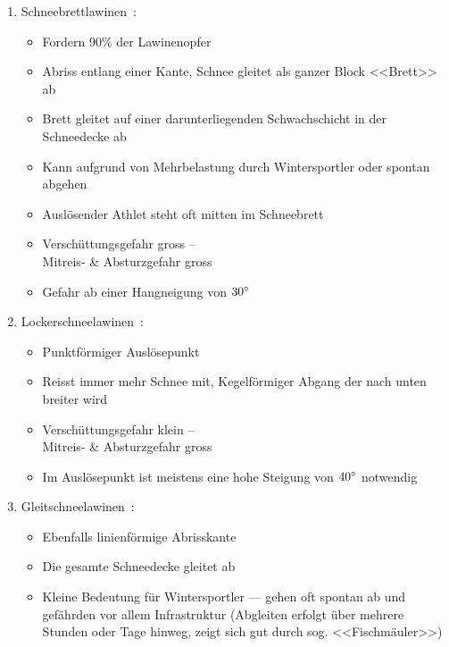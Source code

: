 
\begin{enumerate}
  \item Schneebrettlawinen~\cite{harveyrhynerschweizerlawinenkunde}\cite{sacbergspwinter}\cite{slfLawinentypen}:
  \begin{itemize}
    \item Fordern 90\% der Lawinenopfer
    \item Abriss entlang einer Kante, Schnee gleitet als ganzer Block <<Brett>> ab
    \item Brett gleitet auf einer darunterliegenden Schwachschicht in der Schneedecke ab
    \item Kann aufgrund von Mehrbelastung durch Wintersportler oder spontan abgehen
    \item Auslösender Athlet steht oft mitten im Schneebrett
    \item Verschüttungsgefahr gross –\\ Mitreis- \& Absturzgefahr gross
    \item Gefahr ab einer Hangneigung von $30\degree$
  \end{itemize}
    
  \item Lockerschneelawinen~\cite{harveyrhynerschweizerlawinenkunde}\cite{sacbergspwinter}\cite{slfLawinentypen}:
  \begin{itemize}
    \item Punktförmiger Auslösepunkt
    \item Reisst immer mehr Schnee mit, Kegelförmiger Abgang der nach unten breiter wird
    \item Verschüttungsgefahr klein –\\ Mitreis- \& Absturzgefahr gross
    \item Im Auslösepunkt ist meistens eine hohe Steigung von $40\degree$ notwendig
  \end{itemize}

  \item Gleitschneelawinen~\cite{harveyrhynerschweizerlawinenkunde}\cite{sacbergspwinter}\cite{slfLawinentypen}:
  \begin{itemize}
    \item Ebenfalls linienförmige Abrisskante
    \item Die gesamte Schneedecke gleitet ab
    \item Kleine Bedeutung für Wintersportler –-- gehen oft spontan ab und gefährden vor allem Infrastruktur (Abgleiten erfolgt über mehrere Stunden oder Tage hinweg, zeigt sich gut durch sog. <<Fischmäuler>>)
  \end{itemize}
\end{enumerate}
